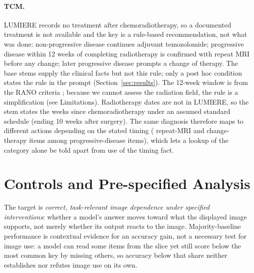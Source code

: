 \documentclass[11pt]{article}
\begin{document}
\paragraph{TCM.} LUMIERE records no treatment after chemoradiotherapy, so a documented treatment is not available and the key is a rule-based recommendation, not what was done: non-progressive disease continues adjuvant temozolomide; progressive disease within 12 weeks of completing radiotherapy is confirmed with repeat MRI before any change; later progressive disease prompts a change of therapy. The base stems supply the clinical facts but not this rule; only a post hoc condition states the rule in the prompt (Section~\ref{sec:results}). The 12-week window is from the RANO criteria \citep{wen2010updated}; because we cannot assess the radiation field, the rule is a simplification (see Limitations). Radiotherapy dates are not in LUMIERE, so the stem states the weeks since chemoradiotherapy under an assumed standard schedule (ending 10 weeks after surgery). The same diagnosis therefore maps to different actions depending on the stated timing (\vfourTcmConfirm{} repeat-MRI and \vfourTcmEscalate{} change-therapy items among \vfourTcmPdItems{} progressive-disease items), which lets a lookup of the category alone be told apart from use of the timing fact.




\section{Controls and Pre-specified Analysis}
\label{sec:controls}

The target is \emph{correct, task-relevant image dependence under specified interventions}: whether a model's answer moves toward what the displayed image supports, not merely whether its output reacts to the image. Majority-baseline performance is contextual evidence for an accuracy gain, not a necessary test for image use: a model can read some items from the slice yet still score below the most common key by missing others, so accuracy below that share neither establishes nor refutes image use on its own.

\end{document}
